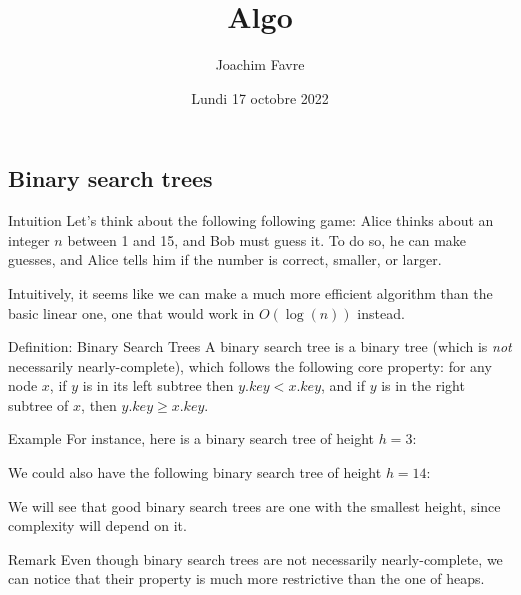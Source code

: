 \documentclass[a4paper]{article}
\title{Algo}
\author{Joachim Favre}
\date{Lundi 17 octobre 2022}
\begin{document}
\maketitle



\subsection{Binary search trees}
\begin{parag}{Intuition}
    Let's think about the following following game: Alice thinks about an integer $n$ between 1 and 15, and Bob must guess it. To do so, he can make guesses, and Alice tells him if the number is correct, smaller, or larger. 

    Intuitively, it seems like we can make a much more efficient algorithm than the basic linear one, one that would work in $O\left(\log\left(n\right)\right)$ instead.
\end{parag}

\begin{parag}{Definition: Binary Search Trees}
    A binary search tree is a binary tree (which is \textit{not} necessarily nearly-complete), which follows the following core property: for any node $x$, if $y$ is in its left subtree then $y.key < x.key$, and if $y$ is in the right subtree of $x$, then $y.key \geq x.key$.

    \begin{subparag}{Example}
        For instance, here is a binary search tree of height $h = 3$:

        We could also have the following binary search tree of height $h = 14$:

        We will see that good binary search trees are one with the smallest height, since complexity will depend on it.
    \end{subparag}

    \begin{subparag}{Remark}
        Even though binary search trees are not necessarily nearly-complete, we can notice that their property is much more restrictive than the one of heaps.
    \end{subparag}
    
\end{parag}
\end{document}
